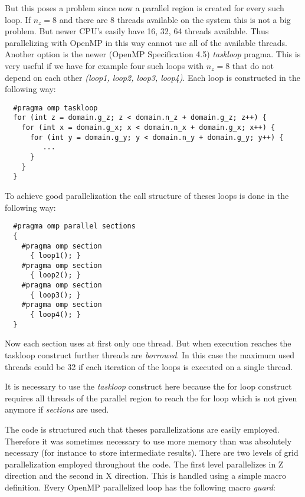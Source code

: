 \documentclass[master.tex]{subfiles}
\begin{document}
But this poses a problem since now a parallel region is created for every such loop. If $n_z=8$ and there are 8 threads available on the system this is not a big problem. But newer CPU's easily have 16, 32, 64 threads available. Thus parallelizing with OpenMP in this way cannot use all of the available threads. Another option is the newer (OpenMP Specification 4.5) \textit{taskloop} pragma. This is very useful if we have for example four such loops with $n_z=8$ that do not depend on each other \textit{(loop1, loop2, loop3, loop4)}. Each loop is constructed in the following way:
\begin{lstlisting}
  #pragma omp taskloop
  for (int z = domain.g_z; z < domain.n_z + domain.g_z; z++) {
    for (int x = domain.g_x; x < domain.n_x + domain.g_x; x++) {
      for (int y = domain.g_y; y < domain.n_y + domain.g_y; y++) {
         ...
      }
    }
  }
\end{lstlisting}


To achieve good parallelization the call structure of theses loops is done in the following way:
\begin{lstlisting}
  #pragma omp parallel sections
  {
    #pragma omp section 
      { loop1(); }
    #pragma omp section
      { loop2(); }
    #pragma omp section
      { loop3(); }
    #pragma omp section
      { loop4(); }
  }
\end{lstlisting}
Now each section uses at first only one thread. But when execution reaches the taskloop construct further threads are \textit{borrowed}. In this case the maximum used threads could be 32 if each iteration of the loops is executed on a single thread.\newline

\begin{blockquote}
  \small
  It is necessary to use the \textit{taskloop} construct here because the for loop construct requires all threads of the parallel region to reach the for loop which is not given anymore if \textit{sections} are used.
\end{blockquote}

The code is structured such that theses parallelizations are easily employed. Therefore it was sometimes necessary to use more memory than was absolutely necessary (for instance to store intermediate results).\newline
There are two levels of grid parallelization employed throughout the code. The first level parallelizes in Z direction and the second in X direction. This is handled using a simple macro definition. Every OpenMP parallelized loop has the following macro \textit{guard}:
\end{document}
